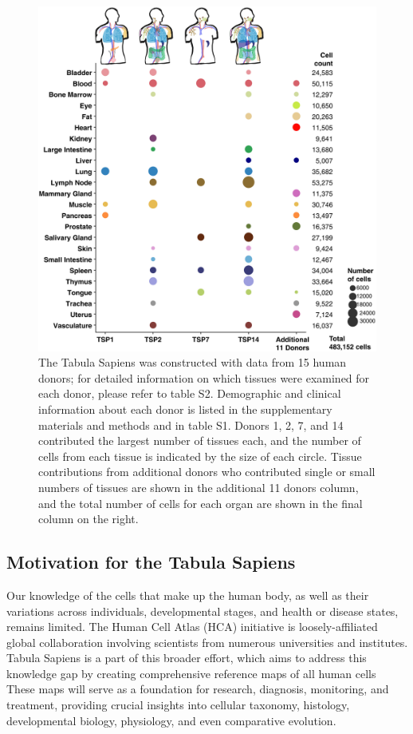 \begin{figure}[hbt!]
\centering
\includegraphics[width=14cm, keepaspectratio]{figs/paper1/fig0_Tabula_Summary.jpg}
\caption[ Overview of Tabula Sapiens.]{The Tabula Sapiens was constructed with data from 15 human donors; for detailed information on which tissues were examined for each donor, please refer to table S2. Demographic and clinical information about each donor is listed in the supplementary materials and methods and in table S1. Donors 1, 2, 7, and 14 contributed the largest number of tissues each, and the number of cells from each tissue is indicated by the size of each circle. Tissue contributions from additional donors who contributed single or small numbers of tissues are shown in the additional 11 donors column, and the total number of cells for each organ are shown in the final column on the right.}
\label{fig:paper1_summary}
\end{figure}

\subsection{Motivation for the Tabula Sapiens}

Our knowledge of the cells that make up the human body, as well as their variations across individuals, developmental stages, and health or disease states, remains limited. The Human Cell Atlas (HCA) initiative is loosely-affiliated global collaboration involving scientists from numerous universities and institutes. Tabula Sapiens is a part of this broader effort, which aims to address this knowledge gap by creating comprehensive reference maps of all human cells\cite{regev2017human} These maps will serve as a foundation for research, diagnosis, monitoring, and treatment, providing crucial insights into cellular taxonomy, histology, developmental biology, physiology, and even comparative evolution.

